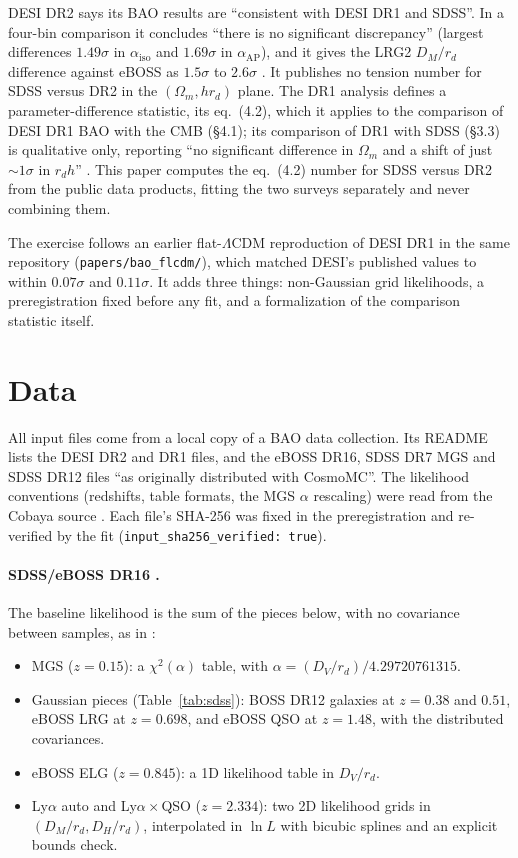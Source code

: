 \documentclass[11pt]{article}
\begin{document}
DESI DR2 says its BAO results are ``consistent with DESI DR1 and SDSS''. In
a four-bin comparison it concludes ``there is no significant discrepancy''
(largest differences $1.49\sigma$ in $\alpha_\mathrm{iso}$ and $1.69\sigma$
in $\alpha_\mathrm{AP}$), and it gives the LRG2 $D_M/r_d$ difference against
eBOSS as $1.5\sigma$ to $2.6\sigma$ \cite{desi2025dr2}. It publishes no
tension number for SDSS versus DR2 in the $(\Omega_m,h r_d)$ plane. The DR1
analysis defines a parameter-difference statistic, its eq.~(4.2), which it
applies to the comparison of DESI DR1 BAO with the CMB (\S4.1);
its comparison of DR1 with SDSS (\S3.3) is qualitative only, reporting ``no
significant difference in $\Omega_m$ and a shift of just $\sim1\sigma$ in
$r_d h$'' \cite{desi2024vi}. This paper computes the eq.~(4.2) number for
SDSS versus DR2 from the
public data products, fitting the two surveys separately and never
combining them.

The exercise follows an earlier flat-$\Lambda$CDM reproduction of DESI DR1
in the same repository (\texttt{papers/bao\_flcdm/}), which matched DESI's
published values to within $0.07\sigma$ and $0.11\sigma$. It adds three
things: non-Gaussian grid likelihoods, a preregistration fixed before any
fit, and a formalization of the comparison statistic itself.

\section{Data}

All input files come from a local copy of a BAO data collection. Its
README lists the DESI DR2 and DR1 files, and the eBOSS DR16, SDSS DR7 MGS
and SDSS DR12 files ``as originally distributed with CosmoMC''. The
likelihood conventions (redshifts, table formats, the MGS
$\alpha$ rescaling) were read from the Cobaya source \cite{cobaya}. Each
file's SHA-256 was fixed in the preregistration and re-verified by the fit
(\texttt{input\_sha256\_verified: true}).

\paragraph{SDSS/eBOSS DR16 \cite{alam2021}.} The baseline likelihood is the
sum of the pieces below, with no covariance between samples, as in
\cite{alam2021}:
\begin{itemize}
\item MGS ($z=0.15$): a $\chi^2(\alpha)$ table, with
  $\alpha=(D_V/r_d)/4.29720761315$.
\item Gaussian pieces (Table~\ref{tab:sdss}): BOSS DR12 galaxies at $z=0.38$
  and $0.51$, eBOSS LRG at $z=0.698$, and eBOSS QSO at $z=1.48$, with the
  distributed covariances.
\item eBOSS ELG ($z=0.845$): a 1D likelihood table in $D_V/r_d$.
\item Ly$\alpha$ auto and Ly$\alpha\times$QSO ($z=2.334$): two 2D
  likelihood grids in $(D_M/r_d, D_H/r_d)$, interpolated in $\ln L$ with
  bicubic splines and an explicit bounds check.
\end{itemize}
\end{document}

